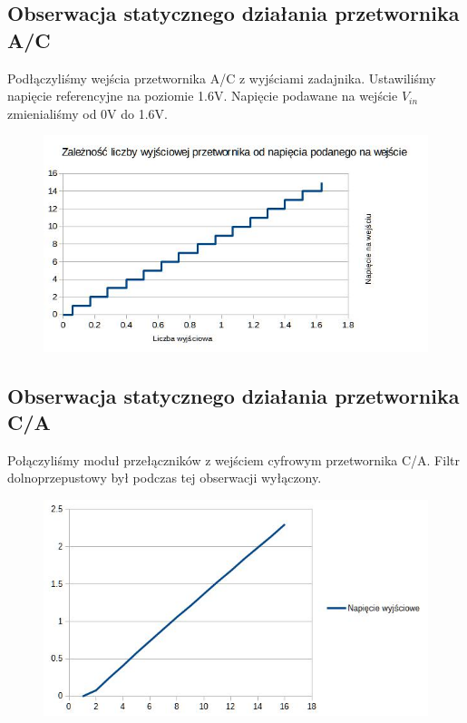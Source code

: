 \documentclass{article}
\begin{document}
\subsection{Obserwacja statycznego działania przetwornika A/C}
Podłączyliśmy wejścia przetwornika A/C z wyjściami zadajnika. Ustawiliśmy napięcie referencyjne na poziomie 1.6V.
Napięcie podawane na wejście $V_{in}$ zmienialiśmy od 0V do 1.6V.
\begin{figure}[h!]
	\centering
	\includegraphics[scale=0.4]{ch03}
\end{figure}


\subsection{Obserwacja statycznego działania przetwornika C/A}
Połączyliśmy moduł przełączników z wejściem cyfrowym przetwornika C/A. Filtr dolnoprzepustowy był podczas tej obserwacji
wyłączony.
\begin{figure}[h!]
	\centering
	\includegraphics[scale=0.35]{ch04}
\end{figure}

\clearpage
\end{document}
